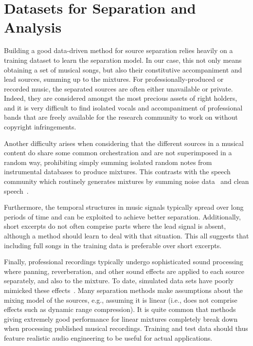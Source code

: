 \chapter{Datasets for Separation and Analysis}

Building a good data-driven method for source separation relies heavily on a training dataset to learn the separation model. In our case, this not only means obtaining a set of musical songs, but also their constitutive accompaniment and lead sources, summing up to the mixtures. For professionally-produced or recorded music, the separated sources are often either unavailable or private. Indeed, they are considered amongst the most precious assets of right holders, and it is very difficult to find isolated vocals and accompaniment of professional bands that are freely available for the research community to work on without copyright infringements.

Another difficulty arises when considering that the different sources in a musical content do share some common orchestration and are not superimposed in a random way, prohibiting simply summing isolated random notes from instrumental databases to produce mixtures. This contrasts with the speech community which routinely generates mixtures by summing noise data~\cite{varga93} and clean speech~\cite{garofolo93}.

Furthermore, the temporal structures in music signals typically spread over long periods of time and can be exploited to achieve better separation. Additionally, short excerpts do not often comprise parts where the lead signal is absent, although a method should learn to deal with that situation. This all suggests that including full songs in the training data is preferable over short excerpts.

Finally, professional recordings typically undergo sophisticated sound processing where panning, reverberation, and other sound effects are applied to each source separately, and also to the mixture. To date, simulated data sets have poorly mimicked these effects~\cite{sturmel12}. Many separation methods make  assumptions about the mixing model of the sources, e.g., assuming it is linear (i.e., does not comprise effects such as dynamic range compression). It is quite common that methods giving extremely good performance for linear mixtures completely break down when processing published musical recordings. Training and test data should thus feature realistic audio engineering to be useful for actual applications.

